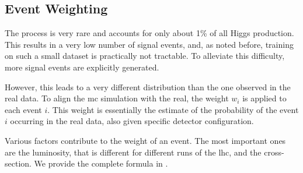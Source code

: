 \subsection{Event Weighting}

The \tth process is very rare and accounts for only about 1\% of all Higgs production. This results in a very low number of
signal events, and, as noted before, training on such a small dataset is practically not tractable. To alleviate this
difficulty, more signal events are explicitly generated.

However, this leads to a very different distribution than the one observed in the real data. To align the \gls{mc}
simulation with the real, the weight $w_i$ is applied to each event $i$. This weight is essentially the estimate of the
probability of the event $i$ occurring in the real data, also given specific detector configuration.

Various factors contribute to the weight of an event. The most important ones are the luminosity, that is different for
different runs of the \gls{lhc}, and the cross-section. We provide the complete formula in
.
